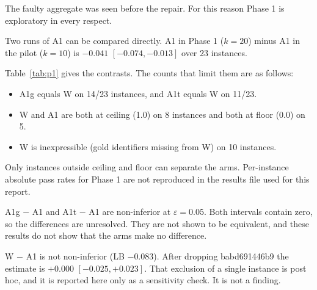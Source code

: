 \documentclass[11pt,a4paper]{article}
\newcommand{\eps}{\varepsilon}
\begin{document}
The faulty aggregate was seen before the repair. For this reason Phase 1 is exploratory in every respect.

Two runs of A1 can be compared directly. A1 in Phase 1 ($k=20$) minus A1 in the pilot ($k=10$) is $-0.041$ $[-0.074, -0.013]$ over 23 instances.

Table~\ref{tab:p1} gives the contrasts. The counts that limit them are as follows:
\begin{itemize}
\item A1g equals W on 14/23 instances, and A1t equals W on 11/23.
\item W and A1 are both at ceiling (1.0) on 8 instances and both at floor (0.0) on 5.
\item W is inexpressible (gold identifiers missing from W) on 10 instances.
\end{itemize}
Only instances outside ceiling and floor can separate the arms. Per-instance absolute pass rates for Phase 1 are not reproduced in the results file used for this report.

\begin{table}[h]
\centering
\caption{Phase 1 paired contrasts (Haiku 5.5, $k=20$, $n=23$). ``Without most influential'' drops the single instance named. The token columns give the median prompt tokens of the first arm and of A1.}
\label{tab:p1}
\end{table}

A1g $-$ A1 and A1t $-$ A1 are non-inferior at $\eps = 0.05$. Both intervals contain zero, so the differences are unresolved. They are not shown to be equivalent, and these results do not show that the arms make no difference.

W $-$ A1 is not non-inferior (LB $-0.083$). After dropping babd691446b9 the estimate is $+0.000$ $[-0.025, +0.023]$. That exclusion of a single instance is post hoc, and it is reported here only as a sensitivity check. It is not a finding.
\end{document}
